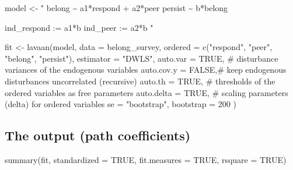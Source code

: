 \documentclass[
  letterpaper,
  DIV=11,
  numbers=noendperiod]{scrartcl}
\newenvironment{Shaded}{\begin{snugshade}}{\end{snugshade}}
\newcommand{\AttributeTok}[1]{\textcolor[rgb]{0.40,0.45,0.13}{#1}}
\newcommand{\CommentTok}[1]{\textcolor[rgb]{0.37,0.37,0.37}{#1}}
\newcommand{\ConstantTok}[1]{\textcolor[rgb]{0.56,0.35,0.01}{#1}}
\newcommand{\DecValTok}[1]{\textcolor[rgb]{0.68,0.00,0.00}{#1}}
\newcommand{\FunctionTok}[1]{\textcolor[rgb]{0.28,0.35,0.67}{#1}}
\newcommand{\NormalTok}[1]{\textcolor[rgb]{0.00,0.23,0.31}{#1}}
\newcommand{\OtherTok}[1]{\textcolor[rgb]{0.00,0.23,0.31}{#1}}
\newcommand{\StringTok}[1]{\textcolor[rgb]{0.13,0.47,0.30}{#1}}
\begin{document}
\begin{Shaded}
\begin{Highlighting}[]
\NormalTok{model }\OtherTok{\textless{}{-}} \StringTok{"}
\StringTok{  belong  \textasciitilde{} a1*respond + a2*peer}
\StringTok{  persist \textasciitilde{} b*belong}

\StringTok{  ind\_respond := a1*b}
\StringTok{  ind\_peer    := a2*b}
\StringTok{"}

\NormalTok{fit }\OtherTok{\textless{}{-}} \FunctionTok{lavaan}\NormalTok{(model, }\AttributeTok{data =}\NormalTok{ belong\_survey,}
              \AttributeTok{ordered =} \FunctionTok{c}\NormalTok{(}\StringTok{"respond"}\NormalTok{, }\StringTok{"peer"}\NormalTok{, }\StringTok{"belong"}\NormalTok{, }\StringTok{"persist"}\NormalTok{),}
              \AttributeTok{estimator =} \StringTok{"DWLS"}\NormalTok{,}
              \AttributeTok{auto.var =} \ConstantTok{TRUE}\NormalTok{,   }\CommentTok{\# disturbance variances of the endogenous variables}
              \AttributeTok{auto.cov.y =} \ConstantTok{FALSE}\NormalTok{,}\CommentTok{\# keep endogenous disturbances uncorrelated (recursive)}
              \AttributeTok{auto.th =} \ConstantTok{TRUE}\NormalTok{,    }\CommentTok{\# thresholds of the ordered variables as free parameters}
              \AttributeTok{auto.delta =} \ConstantTok{TRUE}\NormalTok{, }\CommentTok{\# scaling parameters (delta) for ordered variables}
              \AttributeTok{se =} \StringTok{"bootstrap"}\NormalTok{, }\AttributeTok{bootstrap =} \DecValTok{200}
\NormalTok{              )}
\end{Highlighting}
\end{Shaded}

\subsection{The output (path
coefficients)}\label{the-output-path-coefficients}

\begin{Shaded}
\begin{Highlighting}[]
\FunctionTok{summary}\NormalTok{(fit, }\AttributeTok{standardized =} \ConstantTok{TRUE}\NormalTok{, }\AttributeTok{fit.measures =} \ConstantTok{TRUE}\NormalTok{, }\AttributeTok{rsquare =} \ConstantTok{TRUE}\NormalTok{)}
\end{Highlighting}
\end{Shaded}
\end{document}
